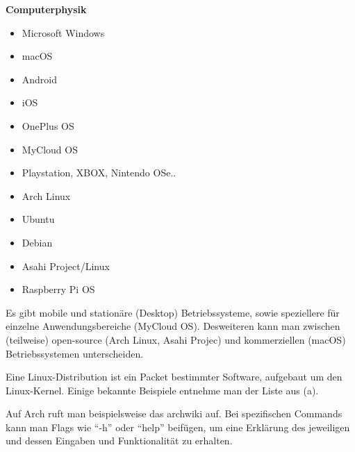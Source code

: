\documentclass{scrartcl}
\begin{document}
\centerline{\Large\textbf{Computerphysik}}
\noindent\makebox[\linewidth]{\rule{11cm}{1pt}}

\aufgabe
    \subaufgabe
        \begin{itemize}
            \item Microsoft Windows
            \item macOS
            \item Android
            \item iOS
            \item OnePlus OS
            \item MyCloud OS
            \item Playstation, XBOX, Nintendo OSe..
            \item Arch Linux
            \item Ubuntu
            \item Debian
            \item Asahi Project/Linux
            \item Raspberry Pi OS
        \end{itemize}
        Es gibt mobile und stationäre (Desktop) Betriebssysteme, sowie speziellere für einzelne Anwendungsbereiche (MyCloud OS). Desweiteren kann man zwischen (teilweise) open-source (Arch Linux, Asahi Projec) und kommerziellen (macOS) Betriebssystemen unterscheiden.
        
    \subaufgabe
        Eine Linux-Distribution ist ein Packet bestimmter Software, aufgebaut um den Linux-Kernel. Einige bekannte Beispiele entnehme man der Liste aus (a).

    \subaufgabe
        Auf Arch ruft man beispielsweise das archwiki auf. Bei spezifischen Commands kann man Flags wie \enquote{-h} oder \enquote{help} beifügen, um eine Erklärung des jeweiligen und dessen Eingaben und Funktionalität zu erhalten. 
\end{document}

